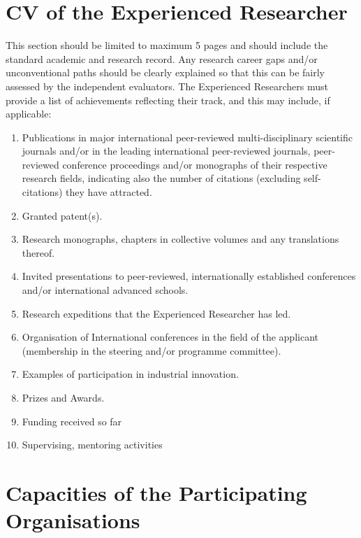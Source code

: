 \documentclass[a4paper,11pt]{article}
\begin{document}
\newpage
\section{CV of the Experienced Researcher}
\label{sec:cv}

This section should be limited to maximum 5 pages and should include the standard academic and research record. Any research career gaps and/or unconventional paths should be clearly explained so that this can be fairly assessed by the independent evaluators.
The Experienced Researchers must provide a list of achievements reflecting their track, and this may include, if applicable:

\begin{enumerate}
\item Publications in major international peer-reviewed multi-disciplinary scientific journals and/or in the leading international peer-reviewed journals, peer-reviewed conference proceedings and/or monographs of their respective research fields, indicating also the number of citations (excluding self-citations) they have attracted.
\item Granted patent(s).
\item Research monographs, chapters in collective volumes and any translations thereof.
\item Invited presentations to peer-reviewed, internationally established conferences and/or international advanced schools.
\item Research expeditions that the Experienced Researcher has led. 
\item Organisation of International conferences in the field of the applicant (membership in the steering and/or programme committee).
\item Examples of participation in industrial innovation.
\item Prizes and Awards.
\item Funding received so far
\item Supervising, mentoring activities
\end{enumerate}


\newpage
\section{Capacities of the Participating Organisations}
\label{sec:capacities}

\vspace{\baselineskip}
\end{document}
